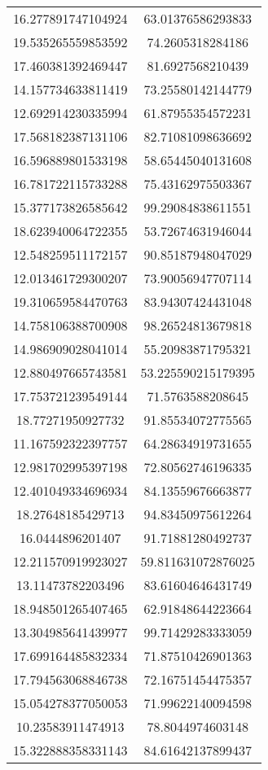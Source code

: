 \begin{table}
\begin{tabular}{cc}
16.277891747104924 & 63.01376586293833 \\
19.535265559853592 & 74.2605318284186 \\
17.460381392469447 & 81.6927568210439 \\
14.157734633811419 & 73.25580142144779 \\
12.692914230335994 & 61.87955354572231 \\
17.568182387131106 & 82.71081098636692 \\
16.596889801533198 & 58.65445040131608 \\
16.781722115733288 & 75.43162975503367 \\
15.377173826585642 & 99.29084838611551 \\
18.623940064722355 & 53.72674631946044 \\
12.548259511172157 & 90.85187948047029 \\
12.013461729300207 & 73.90056947707114 \\
19.310659584470763 & 83.94307424431048 \\
14.758106388700908 & 98.26524813679818 \\
14.986909028041014 & 55.20983871795321 \\
12.880497665743581 & 53.225590215179395 \\
17.753721239549144 & 71.5763588208645 \\
18.77271950927732 & 91.85534072775565 \\
11.167592322397757 & 64.28634919731655 \\
12.981702995397198 & 72.80562746196335 \\
12.401049334696934 & 84.13559676663877 \\
18.27648185429713 & 94.83450975612264 \\
16.0444896201407 & 91.71881280492737 \\
12.211570919923027 & 59.811631072876025 \\
13.11473782203496 & 83.61604646431749 \\
18.948501265407465 & 62.91848644223664 \\
13.304985641439977 & 99.71429283333059 \\
17.699164485832334 & 71.87510426901363 \\
17.794563068846738 & 72.16751454475357 \\
15.054278377050053 & 71.99622140094598 \\
10.23583911474913 & 78.8044974603148 \\
15.322888358331143 & 84.61642137899437 \\

\end{tabular}
\end{table}

